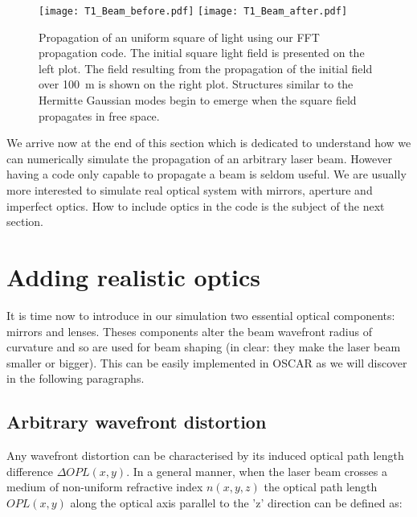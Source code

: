 
\begin{figure}
\begin{center}
\texttt{[image: T1\_Beam\_before.pdf]}\hfill
\texttt{[image: T1\_Beam\_after.pdf]}
\end{center}
\caption{\label{fig4:FFTsquare} Propagation of an uniform square of light using our FFT propagation code. The initial square light field is presented on the left plot. The field resulting from the propagation of the initial field over 100~m is shown on the right plot. Structures similar to the Hermitte Gaussian modes begin to emerge when the square field propagates in free space.}
\end{figure}

We arrive now at the end of this section which is dedicated to understand how we can numerically simulate the propagation of an arbitrary laser beam. However having a code only capable to propagate a beam is seldom useful. We are usually more interested to simulate real optical system with mirrors, aperture and imperfect optics. How to include optics in the code is the subject of the next section.\\

\clearpage


\section{Adding realistic optics}
\label{sec1.3}

It is time now to introduce in our simulation two essential optical components: mirrors and lenses. Theses components alter the beam wavefront radius of curvature and so are used for beam shaping (in clear: they make the laser beam smaller or bigger). This can be easily implemented in OSCAR as we will discover in the following paragraphs.



\subsection{Arbitrary wavefront distortion}

Any wavefront distortion can be characterised by its induced optical path length difference $\Delta OPL(x,y)$. In a general manner, when the laser beam crosses a medium of non-uniform refractive index $n(x,y,z)$ the optical path length $OPL(x,y)$ along the optical axis parallel to the 'z' direction can be defined as:

